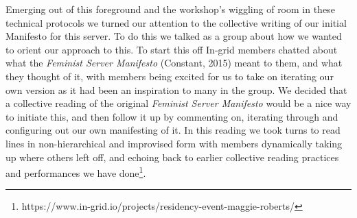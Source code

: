 Emerging out of this foreground and the workshop's wiggling of room in
these technical protocols we turned our attention to the collective
writing of our initial Manifesto for this server. To do this we talked
as a group about how we wanted to orient our approach to this. To start
this off In-grid members chatted about what the \emph{Feminist Server
Manifesto} (Constant, 2015) meant to them, and what they thought of it,
with members being excited for us to take on iterating our own version
as it had been an inspiration to many in the group. We decided that a
collective reading of the original \emph{Feminist Server Manifesto}
would be a nice way to initiate this, and then follow it up by
commenting on, iterating through and configuring out our own manifesting
of it. In this reading we took turns to read lines in non-hierarchical
and improvised form with members dynamically taking up where others left
off, and echoing back to earlier collective reading practices and
performances we have done\footnote{https://www.in-grid.io/projects/residency-event-maggie-roberts/}.

